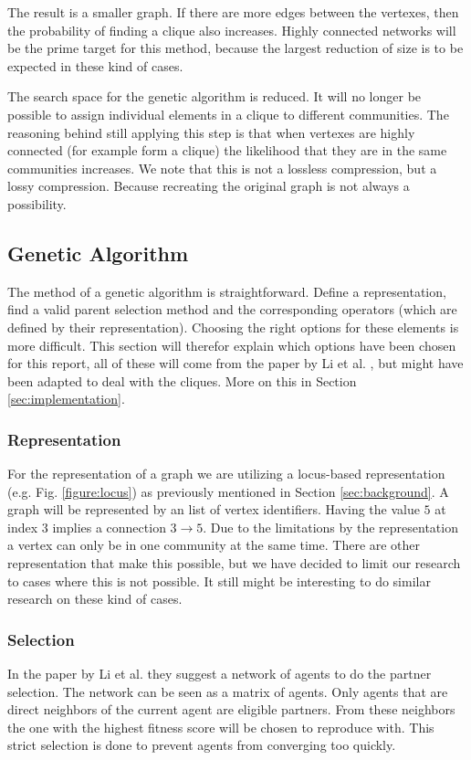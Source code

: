 The result is a smaller graph.
If there are more edges between the vertexes, then the probability of finding a clique also increases.
Highly connected networks will be the prime target for this method, because the largest reduction of size is to be expected in these kind of cases.

The search space for the genetic algorithm is reduced. 
It will no longer be possible to assign individual elements in a clique to different communities.
The reasoning behind still applying this step is that when vertexes are highly connected (for example form a clique) the likelihood that they are in the same communities increases. 
We note that this is not a lossless compression, but a lossy compression.
Because recreating the original graph is not always a possibility.

\subsection{Genetic Algorithm}
The method of a genetic algorithm is straightforward.
Define a representation, find a valid parent selection method and the corresponding operators (which are defined by their representation).
Choosing the right options for these elements is more difficult.
This section will therefor explain which options have been chosen for this report, all of these will come from the paper by Li et al. \cite{Li2016}, but might have been adapted to deal with the cliques.
More on this in Section \ref{sec:implementation}.

\subsubsection{Representation}
For the representation of a graph we are utilizing a locus-based representation (e.g. Fig. \ref{figure:locus}) as previously mentioned in Section \ref{sec:background}.
A graph will be represented by an list of vertex identifiers.
Having the value $5$ at index $3$ implies a connection $3 \rightarrow 5$.
Due to the limitations by the representation a vertex can only be in one community at the same time.
There are other representation that make this possible, but we have decided to limit our research to cases where this is not possible.
It still might be interesting to do similar research on these kind of cases.

\subsubsection{Selection}
In the paper by Li et al. \cite{Li2016} they suggest a network of agents to do the partner selection.
The network can be seen as a matrix of agents.
Only agents that are direct neighbors of the current agent are eligible partners.
From these neighbors the one with the highest fitness score will be chosen to reproduce with.
This strict selection is done to prevent agents from converging too quickly.

